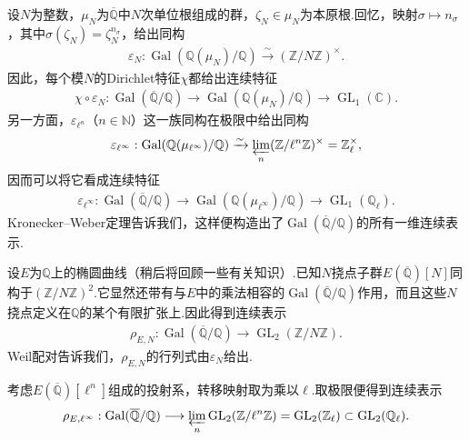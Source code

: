 \begin{example*}[$n=1$：分圆特征]

设$N$为整数，$\mu_N$为$\overline{\mathbb Q}$中$N$次单位根组成的群，$\zeta_N\in\mu_N$为本原根.回忆，映射$\sigma\mapsto n_\sigma$，其中$\sigma(\zeta_N)=\zeta_N^{n_\sigma}$，给出同构
\begin{align*}
\varepsilon_N:\operatorname{Gal}(\mathbb Q(\mu_N)/\mathbb Q)\xrightarrow{\sim}(\mathbb Z/N\mathbb Z)^\times.
\end{align*}
因此，每个模$N$的Dirichlet特征$\chi$都给出连续特征
\begin{align*}
\chi\circ\varepsilon_N:\operatorname{Gal}(\overline{\mathbb Q}/\mathbb Q)
\longrightarrow\operatorname{Gal}(\mathbb Q(\mu_N)/\mathbb Q)
\longrightarrow\operatorname{GL}_1(\mathbb C).
\end{align*}
另一方面，$\varepsilon_{\ell^n}$（$n\in\mathbb N$）这一族同构在极限中给出同构
\begin{align*}
\varepsilon_{\ell^\infty}:\operatorname{Gal}(\mathbb Q(\mu_{\ell^\infty})/\mathbb Q)
\xrightarrow{\sim}\varprojlim_n(\mathbb Z/\ell^n\mathbb Z)^\times=\mathbb Z_\ell^\times,
\end{align*}
因而可以将它看成连续特征
\begin{align*}
\varepsilon_{\ell^\infty}:\operatorname{Gal}(\overline{\mathbb Q}/\mathbb Q)
\longrightarrow\operatorname{Gal}(\mathbb Q(\mu_{\ell^\infty})/\mathbb Q)
\longrightarrow\operatorname{GL}_1(\mathbb Q_\ell).
\end{align*}
Kronecker--Weber定理告诉我们，这样便构造出了$\operatorname{Gal}(\overline{\mathbb Q}/\mathbb Q)$的所有一维连续表示.

\end{example*}



\begin{example*}[$n=2$：椭圆曲线]

设$E$为$\mathbb Q$上的椭圆曲线（稍后将回顾一些有关知识）.已知$N$挠点子群$E(\overline{\mathbb Q})[N]$同构于$(\mathbb Z/N\mathbb Z)^2$.它显然还带有与$E$中的乘法相容的$\operatorname{Gal}(\overline{\mathbb Q}/\mathbb Q)$作用，而且这些$N$挠点定义在$\mathbb Q$的某个有限扩张上.因此得到连续表示
\begin{align*}
\rho_{E,N}:\operatorname{Gal}(\overline{\mathbb Q}/\mathbb Q)\longrightarrow\operatorname{GL}_2(\mathbb Z/N\mathbb Z).
\end{align*}
Weil配对告诉我们，$\rho_{E,N}$的行列式由$\varepsilon_N$给出.

考虑$E(\overline{\mathbb Q})[\ell^n]$组成的投射系，转移映射取为乘以$\ell$.取极限便得到连续表示
\begin{align*}
\rho_{E,\ell^\infty}:\operatorname{Gal}(\overline{\mathbb Q}/\mathbb Q)
\longrightarrow\varprojlim_n\operatorname{GL}_2(\mathbb Z/\ell^n\mathbb Z)
=\operatorname{GL}_2(\mathbb Z_\ell)\subset\operatorname{GL}_2(\mathbb Q_\ell).
\end{align*}
\end{example*}



